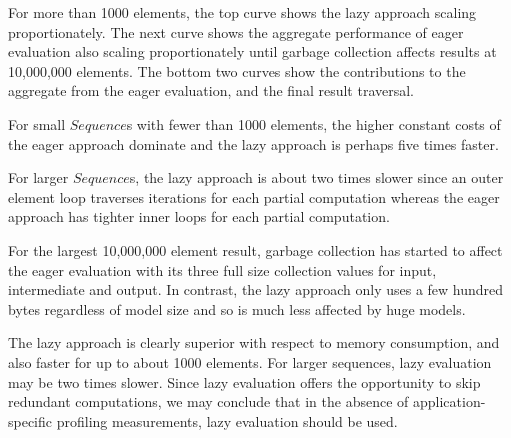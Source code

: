 \documentclass{llncs}
\begin{document}
For more than 1000 elements, the top curve shows the lazy approach scaling proportionately. The next curve shows the aggregate performance of eager evaluation also scaling proportionately until garbage collection affects results at 10,000,000 elements. The bottom two curves show the contributions to the aggregate from the eager evaluation, and the final result traversal.

For small $Sequence$s with fewer than 1000 elements, the higher constant costs of the eager approach dominate and the lazy approach is perhaps five times faster.

For larger $Sequence$s, the lazy approach is about two times slower since an outer element loop traverses iterations for each partial computation whereas the eager approach has tighter inner loops for each partial computation.

For the largest 10,000,000 element result, garbage collection has started to affect the eager evaluation with its three full size  collection values for input, intermediate and output. In contrast, the lazy approach only uses a few hundred bytes regardless of model size and so is much less affected by huge models.

The lazy approach is clearly superior with respect to memory consumption, and also faster for up to about 1000 elements. For larger sequences, lazy evaluation may be two times slower. Since lazy evaluation offers the opportunity to skip redundant computations, we may conclude that in the absence of application-specific profiling measurements, lazy evaluation should be used.



\end{document}
